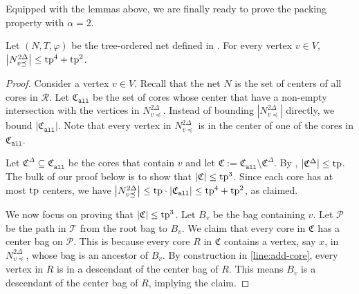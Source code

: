 \documentclass{article}
\newcommand{\tp}{{\rm tp}}
\newcommand{\mP}{\mathcal{P}}
\def\coreSet{\mathcal{R}}
\def\core{R}
\def\C{\mathfrak{C}}
\begin{document}
Equipped with the lemmas above, we are finally ready to prove the packing property with $\alpha=2$.   


\begin{lemma}
	\label{lem:packing} Let $(N,T,\varphi)$ be the tree-ordered net defined in .
	For every vertex $v \in V$,  $\left|N_{v\preceq}^{2\Delta}\right|\le \tp^4 + \tp^2$.
\end{lemma}
\begin{proof}
	Consider a vertex $v \in V$. Recall that the net $N$ is the set of centers of all cores in $\coreSet$.  Let $\C_{\texttt{all}}$ be the set of cores whose center that have a non-empty intersection with the vertices in $N_{v\preceq}^{2\Delta}$. Instead of bounding $|N_{v\preceq}^{2\Delta}|$ directly, we bound $|\C_{\texttt{all}}|$. Note that every vertex in $N_{v\preceq}^{2\Delta}$ is in the center of one of the cores in $\C_{\texttt{all}}$. 
	
	Let $\C^{\Delta} \subseteq \C_{\texttt{all}}$ be the cores that contain $v$ and let $\C := \C_{\texttt{all}} \setminus \C^{\Delta}$.
	By , $|\C^{\Delta}| \leq \tp$. The bulk of our proof below is to show that $|\C|\le \tp^3$. Since each core has at most $\tp$ centers, we have $\left|N_{v\preceq}^{2\Delta}\right|\le \tp\cdot |\C_{\texttt{all}}| \leq \tp^4 + \tp^2$, as claimed. 
	
	
	We now focus on proving that $|\C| \le \tp^3$. Let $B_v$ be the bag containing $v$.  Let $\mP$ be the path in $\mathcal{T}$ from the root bag to $B_v$. We claim that every core in $\C$ has a center bag on $\mP$. This is because every core $\core$ in $\C$ contains a vertex, say $x$, in $N_{v\preceq}^{2\Delta}$, whose bag is an ancestor of  $B_v$. By construction in \cref{line:add-core}, every vertex in $\core$ is in a descendant of the center bag of $\core$. This means $B_v$ is a descendant of the center bag of $\core$, implying the claim. 
	

\end{proof}
\end{document}
